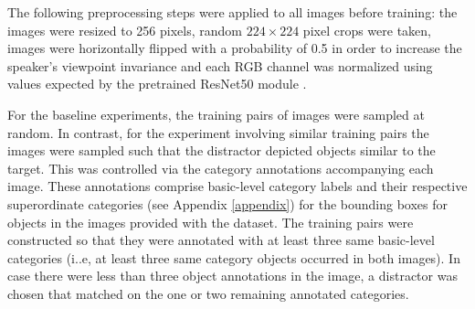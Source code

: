 The following preprocessing steps were applied to all images before training: the images were resized to 256 pixels, random $224\times224$ pixel crops were taken, images were horizontally flipped with a probability of 0.5 in order to increase the speaker's viewpoint invariance and each RGB channel was normalized using values expected by the pretrained ResNet50 module \parencite{he2016deep}.

For the baseline experiments, the training pairs of images were sampled at random. In contrast, for the experiment involving similar training pairs the images were sampled such that the distractor depicted objects similar to the target. This was controlled via the category annotations accompanying each image. These annotations comprise basic-level category labels and their respective superordinate categories (see Appendix \ref{appendix}) for the bounding boxes for objects in the images provided with the dataset.
The training pairs were constructed so that they were annotated with at least three same basic-level categories (i..e, at least three same category objects occurred in both images). In case there were less than three object annotations in the image, a distractor was chosen that matched on the one or two remaining annotated categories.

